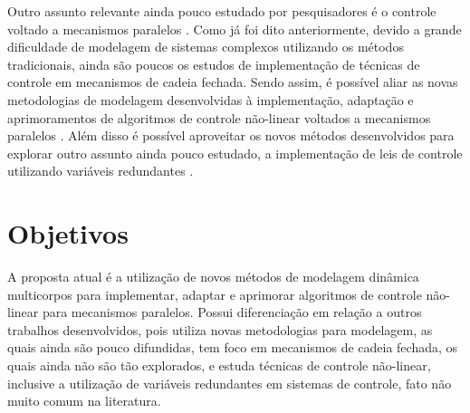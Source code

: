 \documentclass[a4paper,11pt,brazil,fleqn]{article}
\begin{document}
	Outro assunto relevante ainda pouco estudado por pesquisadores \'e o controle voltado a mecanismos paralelos \cite{Merlet2002}. Como j\'a foi dito anteriormente, devido a grande dificuldade de modelagem de sistemas complexos utilizando os m\'etodos tradicionais, ainda s\~ao poucos os estudos de implementa\c{c}\~ao de t\'ecnicas de controle em mecanismos de cadeia fechada. Sendo assim, \'e poss\'ivel aliar as novas metodologias de modelagem desenvolvidas \`a implementa\c{c}\~ao, adapta\c{c}\~ao e aprimoramentos de algoritmos de controle n\~ao-linear voltados a mecanismos paralelos \cite{Craig}. Al\'em disso \'e poss\'ivel aproveitar os novos m\'etodos desenvolvidos para explorar outro assunto ainda pouco estudado, a implementa\c{c}\~ao de leis de controle utilizando vari\'aveis redundantes \cite{ Rynaldo,Jarzebowska2009, Zubizarreta, Bloch}.


\section{Objetivos}\label{S02}

A proposta atual \'e a utiliza\c{c}\~ao de novos m\'etodos de modelagem din\^amica multicorpos para implementar, adaptar e aprimorar algoritmos de controle n\~ao-linear para mecanismos paralelos. Possui diferencia\c{c}\~ao em rela\c{c}\~ao a outros trabalhos desenvolvidos, pois utiliza novas metodologias para modelagem, as quais ainda s\~ao pouco difundidas, tem foco em mecanismos de cadeia fechada, os quais ainda n\~ao s\~ao t\~ao explorados, e estuda t\'ecnicas de controle n\~ao-linear, inclusive a utiliza\c{c}\~ao de vari\'aveis redundantes em sistemas de controle, fato n\~ao muito comum na literatura.
\end{document}
